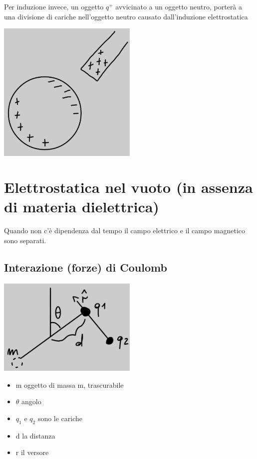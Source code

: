 \documentclass{book}
\begin{document}
 Per induzione invece, un oggetto \begin{math}
     q^+
 \end{math} avvicinato a un oggetto neutro, porterà a una divisione di cariche nell'oggetto neutro 
 causato dall'induzione elettrostatica
 \begin{center}
     \includegraphics[width=0.5\textwidth]{induzione_elettrostatica.jpg}
 \end{center}

 \section{Elettrostatica nel vuoto (in assenza di materia dielettrica)}

Quando non c'è dipendenza dal tempo il campo elettrico e il campo magnetico sono separati.

\subsection{Interazione (forze) di Coulomb}

\begin{center}
    \includegraphics[width=0.5\textwidth]{coulomb.jpg}
\end{center}

\begin{itemize}
    \item m oggetto di massa m, trascurabile
    \item \begin{math}
        \theta
    \end{math} angolo
    \item $q_1$ e $q_2$ sono le cariche
    \item d la distanza
    \item r il versore
\end{itemize}
\end{document}
